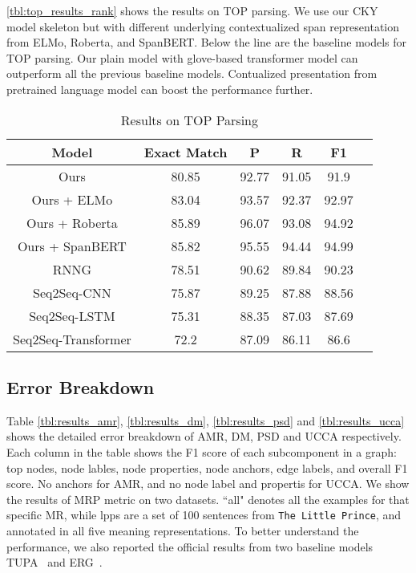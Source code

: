  \autoref{tbl:top_results_rank} shows the results on TOP parsing. We use our CKY model skeleton but with different underlying contextualized span representation from ELMo, Roberta, and SpanBERT. Below the line are the baseline models for TOP parsing. Our plain model with glove-based transformer model can outperform all the previous baseline models. Contualized presentation from pretrained language model can boost the performance further.

\begin{table}[!h]
  \small
\centering
\begin{tabular}{cccccc}
  \toprule
  Model           & Exact Match & P     & R     & F1    \\ \hline
  Ours            & 80.85       & 92.77 & 91.05 & 91.9  \\
  Ours + ELMo     & 83.04       & 93.57 & 92.37 & 92.97 \\
  Ours + Roberta  & 85.89       & 96.07 & 93.08 & 94.92 \\
  Ours + SpanBERT & 85.82       & 95.55 & 94.44 & 94.99 \\ \hline
  RNNG                & 78.51       & 90.62 & 89.84 & 90.23 \\
  Seq2Seq-CNN         & 75.87       & 89.25 & 87.88 & 88.56 \\
  Seq2Seq-LSTM        & 75.31       & 88.35 & 87.03 & 87.69 \\
  Seq2Seq-Transformer & 72.2        & 87.09 & 86.11 & 86.6  \\
  \bottomrule
\end{tabular}
\caption{\label{tbl:top_results_rank} Results on TOP Parsing}
\end{table}

\subsection{Error Breakdown}
\label{ssec:error_breakdown}
Table \ref{tbl:results_amr}, \ref{tbl:results_dm},
\ref{tbl:results_psd} and \ref{tbl:results_ucca} shows the detailed
error breakdown of AMR, DM, PSD and UCCA respectively. Each column in
the table shows the F1 score of each subcomponent in a graph: top
nodes, node lables, node properties, node anchors, edge labels, and
overall F1 score. No anchors for AMR, and no node label and propertis
for UCCA. We show the results of MRP metric on two datasets. ``all"
denotes all the examples for that specific MR, while lpps are a set of
100 sentences from \texttt{The Little Prince}, and annotated in all five
meaning representations. To better understand the performance, we also
reported the official results from two baseline models
TUPA~\cite{Her:Arv:19} and ERG~\cite{Oep:Fli:19}.

